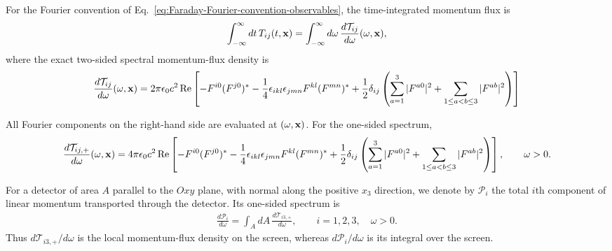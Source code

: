 For the Fourier convention of
Eq.~\eqref{eq:Faraday-Fourier-convention-observables}, the time-integrated
momentum flux is
\begin{align}
  \int_{-\infty}^{\infty}dt\,T_{ij}(t,{\bf x})
  =\int_{-\infty}^{\infty}d\omega\,
  \frac{d\mathcal T_{ij}}{d\omega}(\omega,{\bf x}),
\end{align}
where the exact two-sided spectral momentum-flux density is
\begin{align}
  \frac{d\mathcal T_{ij}}{d\omega}(\omega,{\bf x})
  =2\pi\epsilon_0c^2\operatorname{Re}\left[
    -F^{i0}(F^{j0})^*
    -\frac14\epsilon_{ikl}\epsilon_{jmn}F^{kl}(F^{mn})^*+\frac12\delta_{ij}\left(
      \sum_{a=1}^{3}|F^{a0}|^2
      +\sum_{1\leq a<b\leq3}|F^{ab}|^2
  \right)\right]
  \label{eq:two-sided-spectral-linear-momentum-flux-F}
\end{align}
\begin{highlightbox}[title={One-sided spectral linear-momentum flux density}]
  All Fourier components on the right-hand side are evaluated at
  $(\omega,{\bf x})$.  For the one-sided spectrum,
  \begin{align}
    \frac{d\mathcal T_{ij,+}}{d\omega}(\omega,{\bf x})
    =4\pi\epsilon_0c^2\operatorname{Re}\left[
      -F^{i0}(F^{j0})^*
      -\frac14\epsilon_{ikl}\epsilon_{jmn}F^{kl}(F^{mn})^*+\frac12\delta_{ij}\left(
        \sum_{a=1}^{3}|F^{a0}|^2
        +\sum_{1\leq a<b\leq3}|F^{ab}|^2
    \right)\right],\qquad \omega>0.
    \label{eq:one-sided-spectral-linear-momentum-flux-F}
  \end{align}
\end{highlightbox}

For a detector of area $A$ parallel to the $Oxy$ plane, with normal along
the positive $x_3$ direction, we denote by $\mathcal P_i$ the total $i$th
component of linear momentum transported through the detector.  Its
one-sided spectrum is
\begin{align}
  \frac{d\mathcal P_i}{d\omega}
  =\int_A dA\,\frac{d\mathcal T_{i3,+}}{d\omega},
  \qquad i=1,2,3,\quad \omega>0.
  \label{eq:spectral-screen-integrated-linear-momentum}
\end{align}
Thus $d\mathcal T_{i3,+}/d\omega$ is the local momentum-flux density on the
screen, whereas $d\mathcal P_i/d\omega$ is its integral over the screen.

